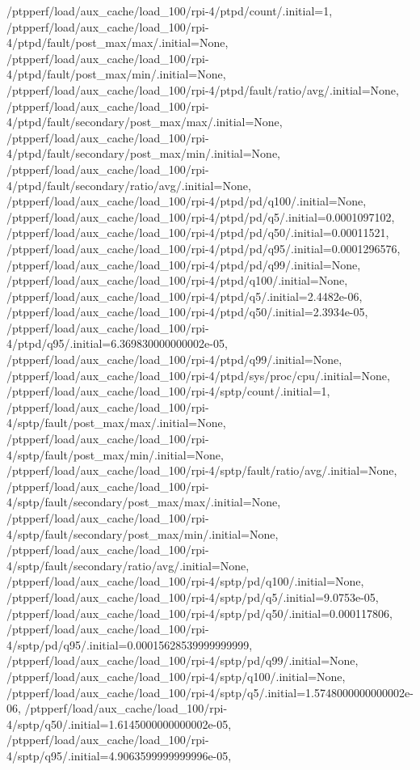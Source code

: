 {    /ptpperf/load/aux_cache/load_100/rpi-4/ptpd/count/.initial=1,
    /ptpperf/load/aux_cache/load_100/rpi-4/ptpd/fault/post_max/max/.initial=None,
    /ptpperf/load/aux_cache/load_100/rpi-4/ptpd/fault/post_max/min/.initial=None,
    /ptpperf/load/aux_cache/load_100/rpi-4/ptpd/fault/ratio/avg/.initial=None,
    /ptpperf/load/aux_cache/load_100/rpi-4/ptpd/fault/secondary/post_max/max/.initial=None,
    /ptpperf/load/aux_cache/load_100/rpi-4/ptpd/fault/secondary/post_max/min/.initial=None,
    /ptpperf/load/aux_cache/load_100/rpi-4/ptpd/fault/secondary/ratio/avg/.initial=None,
    /ptpperf/load/aux_cache/load_100/rpi-4/ptpd/pd/q100/.initial=None,
    /ptpperf/load/aux_cache/load_100/rpi-4/ptpd/pd/q5/.initial=0.0001097102,
    /ptpperf/load/aux_cache/load_100/rpi-4/ptpd/pd/q50/.initial=0.00011521,
    /ptpperf/load/aux_cache/load_100/rpi-4/ptpd/pd/q95/.initial=0.0001296576,
    /ptpperf/load/aux_cache/load_100/rpi-4/ptpd/pd/q99/.initial=None,
    /ptpperf/load/aux_cache/load_100/rpi-4/ptpd/q100/.initial=None,
    /ptpperf/load/aux_cache/load_100/rpi-4/ptpd/q5/.initial=2.4482e-06,
    /ptpperf/load/aux_cache/load_100/rpi-4/ptpd/q50/.initial=2.3934e-05,
    /ptpperf/load/aux_cache/load_100/rpi-4/ptpd/q95/.initial=6.369830000000002e-05,
    /ptpperf/load/aux_cache/load_100/rpi-4/ptpd/q99/.initial=None,
    /ptpperf/load/aux_cache/load_100/rpi-4/ptpd/sys/proc/cpu/.initial=None,
    /ptpperf/load/aux_cache/load_100/rpi-4/sptp/count/.initial=1,
    /ptpperf/load/aux_cache/load_100/rpi-4/sptp/fault/post_max/max/.initial=None,
    /ptpperf/load/aux_cache/load_100/rpi-4/sptp/fault/post_max/min/.initial=None,
    /ptpperf/load/aux_cache/load_100/rpi-4/sptp/fault/ratio/avg/.initial=None,
    /ptpperf/load/aux_cache/load_100/rpi-4/sptp/fault/secondary/post_max/max/.initial=None,
    /ptpperf/load/aux_cache/load_100/rpi-4/sptp/fault/secondary/post_max/min/.initial=None,
    /ptpperf/load/aux_cache/load_100/rpi-4/sptp/fault/secondary/ratio/avg/.initial=None,
    /ptpperf/load/aux_cache/load_100/rpi-4/sptp/pd/q100/.initial=None,
    /ptpperf/load/aux_cache/load_100/rpi-4/sptp/pd/q5/.initial=9.0753e-05,
    /ptpperf/load/aux_cache/load_100/rpi-4/sptp/pd/q50/.initial=0.000117806,
    /ptpperf/load/aux_cache/load_100/rpi-4/sptp/pd/q95/.initial=0.00015628539999999999,
    /ptpperf/load/aux_cache/load_100/rpi-4/sptp/pd/q99/.initial=None,
    /ptpperf/load/aux_cache/load_100/rpi-4/sptp/q100/.initial=None,
    /ptpperf/load/aux_cache/load_100/rpi-4/sptp/q5/.initial=1.5748000000000002e-06,
    /ptpperf/load/aux_cache/load_100/rpi-4/sptp/q50/.initial=1.6145000000000002e-05,
    /ptpperf/load/aux_cache/load_100/rpi-4/sptp/q95/.initial=4.9063599999999996e-05,
}
